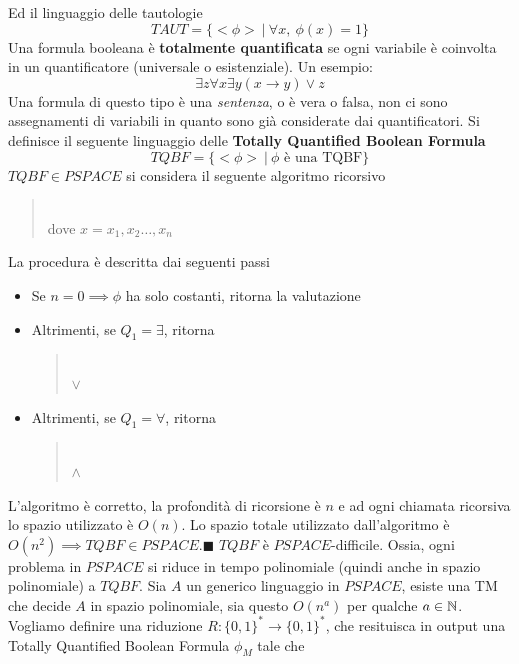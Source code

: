 \documentclass[10pt, letterpaper]{report}
\begin{document}
Ed il linguaggio delle tautologie 
$$ TAUT=\{<\phi> \ | \ \forall x, \ \phi(x)=1\}$$
 Una formula booleana è \textbf{totalmente quantificata} se ogni variabile è coinvolta in un quantificatore (universale o esistenziale). Un esempio:$$\exists z \forall x \exists y (x\rightarrow y) \lor z $$
Una formula di questo tipo è una \textit{sentenza}, o è vera o falsa, non ci sono assegnamenti di variabili in quanto sono già considerate dai quantificatori.
Si definisce il seguente linguaggio delle \textbf{Totally Quantified Boolean Formula}
$$ TQBF=\{<\phi> \ | \ \phi \text{ è una TQBF} \}$$
\teo{} $TQBF\in PSPACE$\acc 
\dimo{} si considera il seguente algoritmo ricorsivo \begin{quote}
     \\ 
    dove $x=x_1,x_2\dots ,x_n$
\end{quote}
La procedura è descritta dai seguenti passi \begin{itemize}
    \item Se $n=0\implies \phi$ ha solo costanti, ritorna la valutazione 
    \item Altrimenti, se $Q_1=\exists$, ritorna \begin{quote}
\\ $\lor$\\
    \end{quote}
    \item Altrimenti, se $Q_1=\forall$, ritorna \begin{quote}
\\ $\land$\\
    \end{quote}
\end{itemize}
L'algoritmo è corretto, la profondità di ricorsione è $n$ e ad ogni chiamata ricorsiva lo spazio utilizzato è $O(n)$. Lo spazio totale utilizzato dall'algoritmo è $O(n^2)\implies TQBF\in PSPACE$.\hfill$\blacksquare$\acc 
\teo{} $TQBF$ è $PSPACE$-difficile. Ossia, ogni problema in $PSPACE$ si riduce in tempo polinomiale (quindi anche in spazio polinomiale) a $TQBF$.\acc 
\dimo{} Sia $A$ un generico linguaggio in $PSPACE$, esiste una TM che decide $A$ in spazio polinomiale, sia questo $O(n^a)$ per qualche $a\in {\mathbb N}$. Vogliamo definire una riduzione $R : \{0,1\}^*\rightarrow \{0,1\}^*$, che resituisca in output una Totally Quantified Boolean Formula $\phi_M$ tale che 
\end{document}
